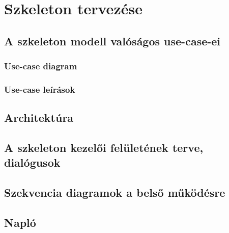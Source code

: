 



\fedlap

\addtocounter{section}{4}
\section{Szkeleton tervezése}

	\subsection{A szkeleton modell valóságos use-case-ei}

		\subsubsection{Use-case diagram}
		
		\subsubsection{Use-case leírások}
	
	\subsection{Architektúra}
	
	\subsection{A szkeleton kezelői felületének terve, dialógusok}
	
	\subsection{Szekvencia diagramok a belső működésre}
	
	\subsection{Napló}

